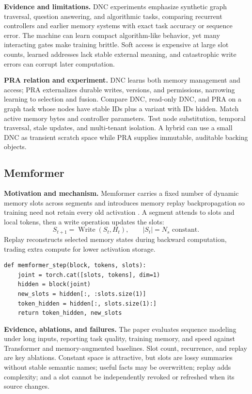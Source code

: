 \textbf{Evidence and limitations.} DNC experiments emphasize synthetic graph traversal,
question answering, and algorithmic tasks, comparing recurrent controllers and earlier
memory systems with exact task accuracy or sequence error. The machine can learn compact
algorithm-like behavior, yet many interacting gates make training brittle.  Soft access
is expensive at large slot counts, learned addresses lack stable external meaning, and
catastrophic write errors can corrupt later computation.

\textbf{PRA relation and experiment.} DNC learns both memory management and access;
PRA externalizes durable writes, versions, and permissions, narrowing learning to selection
and fusion.  Compare DNC, read-only DNC, and PRA on a graph task whose nodes have stable
IDs plus a variant with IDs hidden.  Match active memory bytes and controller parameters.
Test node substitution, temporal traversal, stale updates, and multi-tenant isolation.
A hybrid can use a small DNC as transient scratch space while PRA supplies immutable,
auditable backing objects.

\subsection{Memformer}

\textbf{Motivation and mechanism.} Memformer carries a fixed number of dynamic memory
slots across segments and introduces memory replay backpropagation so training need not
retain every old activation \citep{wu2020memformer}.  A segment attends to slots and local
tokens, then a write operation updates the slots:
\begin{equation}
S_{t+1}=\operatorname{Write}(S_t,H_t),\qquad |S_t|=N_s \text{ constant}.
\end{equation}
Replay reconstructs selected memory states during backward computation, trading extra
compute for lower activation storage.

\begin{lstlisting}[caption={Simplified fixed-slot segment update}]
def memformer_step(block, tokens, slots):
    joint = torch.cat([slots, tokens], dim=1)
    hidden = block(joint)
    new_slots = hidden[:, :slots.size(1)]
    token_hidden = hidden[:, slots.size(1):]
    return token_hidden, new_slots
\end{lstlisting}

\textbf{Evidence, ablations, and failures.} The paper evaluates sequence modeling under
long inputs, reporting task quality, training memory, and speed against Transformer and
memory-augmented baselines.  Slot count, recurrence, and replay are key ablations.  Constant
space is attractive, but slots are lossy summaries without stable semantic names; useful
facts may be overwritten; replay adds complexity; and a slot cannot be independently
revoked or refreshed when its source changes.

